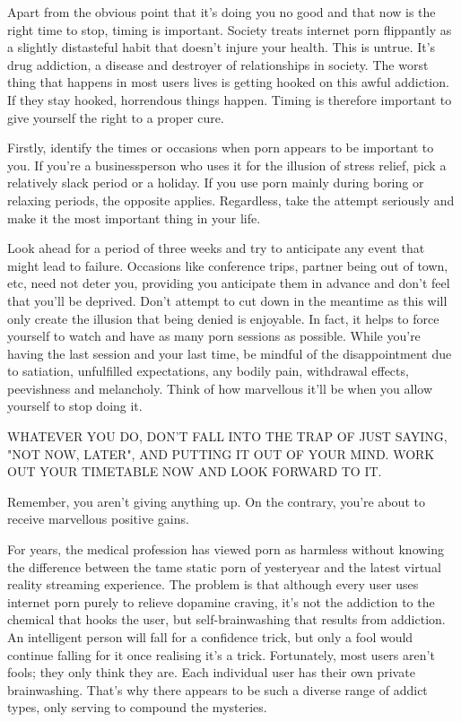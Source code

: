 \documentclass[easypeasy.tex]{subfiles}
\begin{document}
Apart from the obvious point that it's doing you no good and that now is the right time to stop, timing is important. Society treats internet porn flippantly as a slightly distasteful habit that doesn't injure your health. This is untrue. It's drug addiction, a disease and destroyer of relationships in society. The worst thing that happens in most users lives is getting hooked on this awful addiction. If they stay hooked, horrendous things happen. Timing is therefore important to give yourself the right to a proper cure.

Firstly, identify the times or occasions when porn appears to be important to you. If you're a businessperson who uses it for the illusion of stress relief, pick a relatively slack period or a holiday. If you use porn mainly during boring or relaxing periods, the opposite applies. Regardless, take the attempt seriously and make it the most important thing in your life.

Look ahead for a period of three weeks and try to anticipate any event that might lead to failure. Occasions like conference trips, partner being out of town, etc, need not deter you, providing you anticipate them in advance and don't feel that you'll be deprived. Don't attempt to cut down in the meantime as this will only create the illusion that being denied is enjoyable. In fact, it helps to force yourself to watch and have as many porn sessions as possible. While you're having the last session and your last time, be mindful of the disappointment due to satiation, unfulfilled expectations, any bodily pain, withdrawal effects, peevishness and melancholy. Think of how marvellous it'll be when you allow yourself to stop doing it.

{\large WHATEVER YOU DO, DON'T FALL INTO THE TRAP OF JUST SAYING, "NOT NOW, LATER", AND PUTTING IT OUT OF YOUR MIND. WORK OUT YOUR TIMETABLE NOW AND LOOK FORWARD TO IT.}

Remember, you aren't giving anything up. On the contrary, you're about to receive marvellous positive gains.

For years, the medical profession has viewed porn as harmless without knowing the difference between the tame static porn of yesteryear and the latest virtual reality streaming experience. The problem is that although every user uses internet porn purely to relieve dopamine craving, it's not the addiction to the chemical that hooks the user, but self-brainwashing that results from addiction. An intelligent person will fall for a confidence trick, but only a fool would continue falling for it once realising it's a trick. Fortunately, most users aren't fools; they only think they are. Each individual user has their own private brainwashing. That's why there appears to be such a diverse range of addict types, only serving to compound the mysteries.
\end{document}
